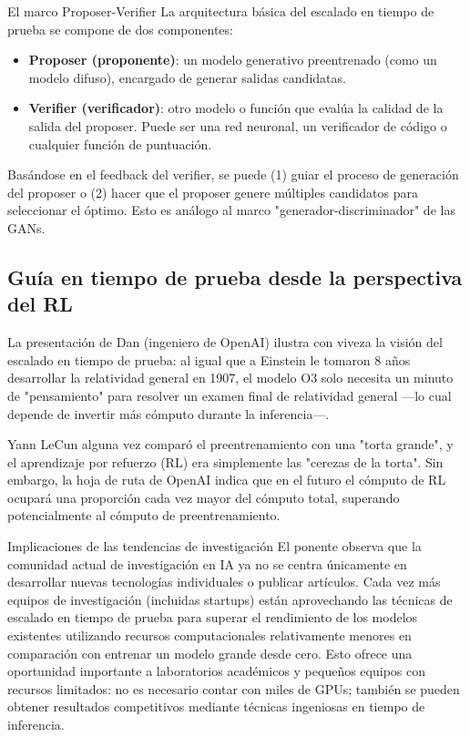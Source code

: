 \documentclass[a4paper]{article}
\begin{document}
\begin{importantbox}{El marco Proposer-Verifier}
La arquitectura básica del escalado en tiempo de prueba se compone de dos componentes:
\begin{itemize}
    \item \textbf{Proposer (proponente)}: un modelo generativo preentrenado (como un modelo difuso), encargado de generar salidas candidatas.
    \item \textbf{Verifier (verificador)}: otro modelo o función que evalúa la calidad de la salida del proposer. Puede ser una red neuronal, un verificador de código o cualquier función de puntuación.
\end{itemize}
Basándose en el feedback del verifier, se puede (1) guiar el proceso de generación del proposer o (2) hacer que el proposer genere múltiples candidatos para seleccionar el óptimo. Esto es análogo al marco "generador-discriminador" de las GANs.
\end{importantbox}

\subsection{Guía en tiempo de prueba desde la perspectiva del RL}

La presentación de Dan (ingeniero de OpenAI) ilustra con viveza la visión del escalado en tiempo de prueba: al igual que a Einstein le tomaron 8 años desarrollar la relatividad general en 1907, el modelo O3 solo necesita un minuto de "pensamiento" para resolver un examen final de relatividad general —lo cual depende de invertir más cómputo durante la inferencia—.

Yann LeCun alguna vez comparó el preentrenamiento con una "torta grande", y el aprendizaje por refuerzo (RL) era simplemente las "cerezas de la torta". Sin embargo, la hoja de ruta de OpenAI indica que en el futuro el cómputo de RL ocupará una proporción cada vez mayor del cómputo total, superando potencialmente al cómputo de preentrenamiento.

\begin{warningbox}{Implicaciones de las tendencias de investigación}
El ponente observa que la comunidad actual de investigación en IA ya no se centra únicamente en desarrollar nuevas tecnologías individuales o publicar artículos. Cada vez más equipos de investigación (incluidas startups) están aprovechando las técnicas de escalado en tiempo de prueba para superar el rendimiento de los modelos existentes utilizando recursos computacionales relativamente menores en comparación con entrenar un modelo grande desde cero. Esto ofrece una oportunidad importante a laboratorios académicos y pequeños equipos con recursos limitados: no es necesario contar con miles de GPUs; también se pueden obtener resultados competitivos mediante técnicas ingeniosas en tiempo de inferencia.
\end{warningbox}
\end{document}

